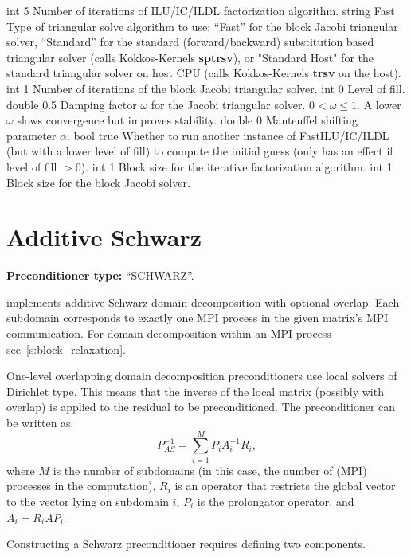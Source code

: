     {int}
    {5}
    {Number of iterations of ILU/IC/ILDL factorization algorithm.}
    {string}
    {Fast}
    {Type of triangular solve algorithm to use: ``Fast'' for the block Jacobi triangular solver, ``Standard'' for the standard (forward/backward) substitution based triangular solver (calls Kokkos-Kernels {\bf sptrsv}), or "Standard Host" for the standard triangular solver on host CPU (calls Kokkos-Kernels {\bf trsv} on the host).}
    {int}
    {1}
    {Number of iterations of the block Jacobi triangular solver.}
    {int}
    {0}
    {Level of fill.}
    {double}
    {0.5}
    {Damping factor $\omega$ for the Jacobi triangular solver. $0 < \omega \leq 1$. A lower $\omega$ slows convergence but improves stability.}
    {double}
    {0}
    {Manteuffel shifting parameter $\alpha$.}
    {bool}
    {true}
    {Whether to run another instance of FastILU/IC/ILDL (but with a lower level of fill) to compute the initial guess (only has an effect if level of fill $> 0$).} 
    {int}
    {1}
    {Block size for the iterative factorization algorithm.}
    {int}
    {1}
    {Block size for the block Jacobi solver.}

\section{Additive Schwarz}\label{s:schwarz}

\textbf{Preconditioner type:} ``SCHWARZ''.

\ifpacktwo{} implements additive Schwarz domain decomposition with optional
overlap. Each subdomain corresponds to exactly one MPI process in the given
matrix's MPI communication. For domain decomposition within an
MPI process see~\ref{s:block_relaxation}.

One-level overlapping domain decomposition preconditioners use local solvers of
Dirichlet type. This means that the inverse of the local matrix (possibly with
overlap) is applied to the residual to be preconditioned. The preconditioner can
be written as:
$$ P_{AS}^{-1} = \sum_{i=1}^M P_i A_i^{-1} R_i, $$
where $M$ is the number of subdomains (in this case, the number of (MPI)
processes in the computation), $R_i$ is an operator that restricts the global
vector to the vector lying on subdomain $i$, $P_i$ is the prolongator
operator, and $A_i = R_i A P_i$.

Constructing a Schwarz preconditioner requires defining two components.


